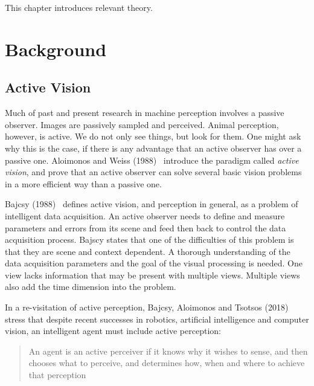 This chapter introduces relevant theory.

\section{Background}

\subsection{Active Vision}


Much of past and present research in machine perception involves a passive observer.
Images are passively sampled and perceived.
Animal perception, however, is active.
We do not only see things, but look for them.
One might ask why this is the case, if there is any advantage that an active observer has over a passive one.
Aloimonos and Weiss (1988)~\cite{aloimonos_active_1988} introduce the paradigm called \textit{active vision}, and prove that an active observer can solve several basic vision problems in a more efficient way than a passive one.

Bajcsy (1988)~\cite{bajcsy_1988} defines active vision, and perception in general, as a problem of intelligent data acquisition.
An active observer needs to define and measure parameters and errors from its scene and feed then back to control the data acquisition process.
Bajscy states that one of the difficulties of this problem is that they are scene and context dependent.
A thorough understanding of the data acquisition parameters and the goal of the visual processing is needed.
One view lacks information that may be present with multiple views.
Multiple views also add the time dimension into the problem.

In a re-visitation of active perception, Bajcsy, Aloimonos and Tsotsos (2018)~\cite{bajcsy_aloimonos_tsotsos_2018} stress that despite recent successes in robotics, artificial intelligence and computer vision, an intelligent agent must include active perception:

\begin{quote}
    An agent is an active perceiver if it knows why it wishes to sense, and then chooses what to perceive, and determines how, when and where to achieve that perception
\end{quote}~\cite{bajcsy_aloimonos_tsotsos_2018}


